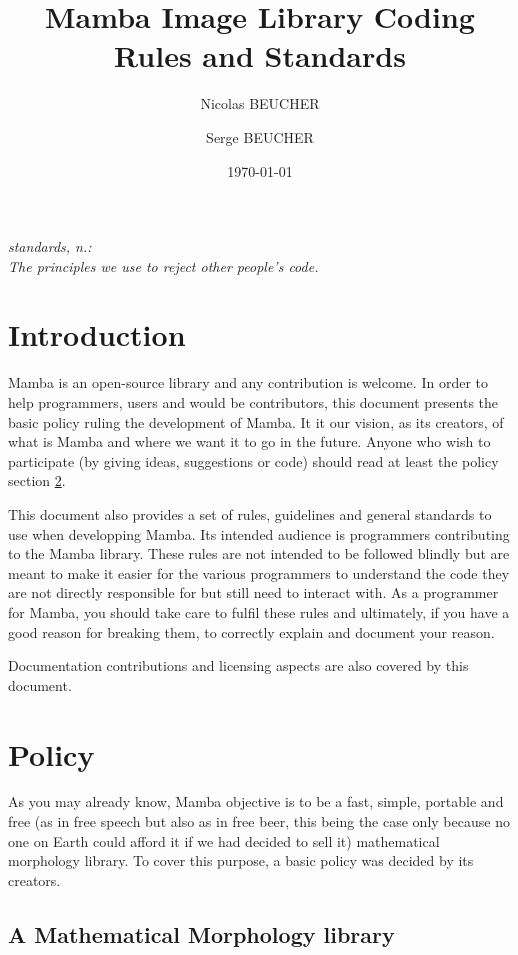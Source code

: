 \documentclass[a4paper,10pt,oneside]{article}
\title{Mamba Image Library Coding Rules and Standards}
\author{Nicolas BEUCHER \and Serge BEUCHER}
\date\today
\begin{document}
\mambaCover 
\mambaContent

 
\begin{minipage}{0.8\textwidth}
\begin{flushleft} \large
\vspace{6cm}
\textit{standards, n.:}\\[0.5cm]
\textit{The principles we use to reject other people's code.}
\end{flushleft}
\end{minipage}
\pagebreak


\section{Introduction}

Mamba is an open-source library and any contribution is welcome. In
order to help programmers, users and would be contributors, this document
presents the basic policy ruling the development of Mamba. It it our
vision, as its creators, of what is Mamba and where we want it to go
in the future. Anyone who wish to participate (by giving ideas, suggestions
or code) should read at least the policy section \ref{cha:Policy}.

This document also provides a set of rules, guidelines and general
standards to use when developping Mamba. Its intended audience is
programmers contributing to the Mamba library. These rules are not
intended to be followed blindly but are meant to make it easier for
the various programmers to understand the code they are not directly
responsible for but still need to interact with. As a programmer for
Mamba, you should take care to fulfil these rules and ultimately, if
you have a good reason for breaking them, to correctly explain and
document your reason.

Documentation contributions and licensing aspects are also covered by
this document.


\section{Policy}
\label{cha:Policy}

As you may already know, Mamba objective is to be a fast, simple,
portable and free (as in free speech but also as in free beer, this
being the case only because no one on Earth could afford it if we
had decided to sell it) mathematical morphology library. To cover
this purpose, a basic policy was decided by its creators.


\subsection{A Mathematical Morphology library}
\end{document}
